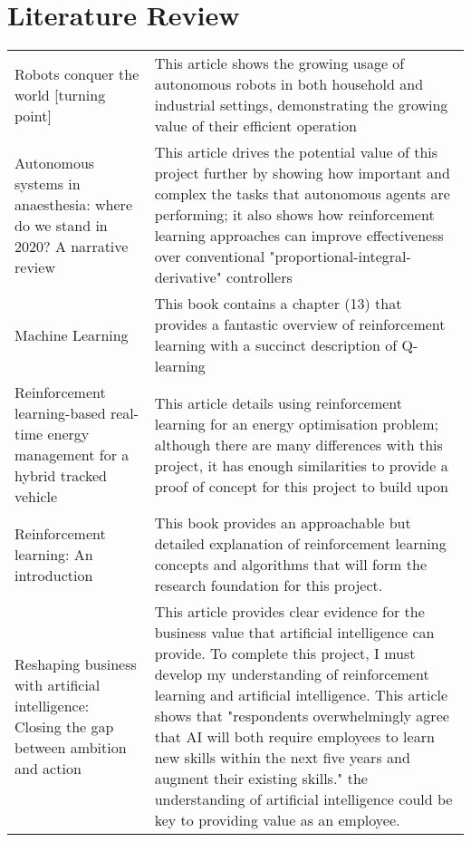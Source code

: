 \documentclass[]{final_report}
\begin{document}
\chapter{Literature Review}

\renewcommand{\arraystretch}{1.5}
\begin{xltabular}{\textwidth}{p{6cm} X}
  Robots conquer the world [turning point]\cite{hagele2016robots} & This article shows the growing usage of autonomous robots in both household and industrial settings, demonstrating the growing value of their efficient operation \\
  Autonomous systems in anaesthesia: where do we stand in 2020? A narrative review\cite{zaouter2020autonomous} & This article drives the potential value of this project further by showing how important and complex the tasks that autonomous agents are performing; it also shows how reinforcement learning approaches can improve effectiveness over conventional "proportional-integral-derivative" controllers \\
  Machine Learning\cite{mitchell1997machine} & This book contains a chapter (13) that provides a fantastic overview of reinforcement learning with a succinct description of Q-learning \\
Reinforcement learning-based real-time energy management for a hybrid tracked vehicle\cite{ZOU2016372} & This article details using reinforcement learning for an energy optimisation problem; although there are many differences with this project, it has enough similarities to provide a proof of concept for this project to build upon \\
Reinforcement learning: An introduction\cite{sutton2018reinforcement} & This book provides an
approachable but detailed explanation of reinforcement learning concepts and algorithms that will form the research foundation for this project. \\
Reshaping business with artificial intelligence: Closing the gap between ambition and action\cite{ransbotham2017reshaping} & This article provides clear evidence for the business value that artificial intelligence can provide. To complete this project, I must develop my understanding of reinforcement learning and artificial intelligence. This article shows that "respondents overwhelmingly agree that AI will both require employees to learn new skills within the next five years and augment their existing skills." the understanding of artificial intelligence could be key to providing value as an employee.   \\

\end{xltabular}
\end{document}
